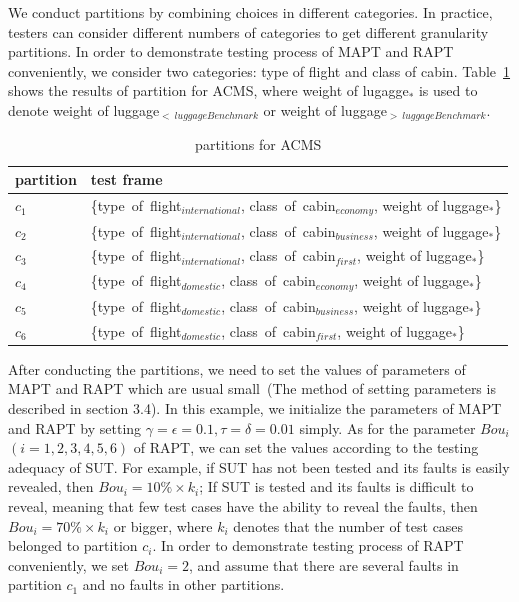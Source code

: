 \documentclass[10pt,journal,compsoc]{IEEEtran}
\begin{document}
We conduct partitions by combining choices in different categories. In practice, testers can consider different numbers of categories to get different granularity partitions. In order to demonstrate testing process of MAPT and RAPT conveniently, we consider two categories: type of flight and class of cabin. Table~\ref{table:partitionrule} shows the results of partition for ACMS, where weight of lugagge$_{*}$ is used to denote weight of luggage$_{<~luggageBenchmark}$ or weight of luggage$_{>~luggageBenchmark}$.
\begin{table}
  \caption{partitions for ACMS}
  \label{table:partitionrule}
  \centering
  \begin{tabular}{|l|l|} \hline
  partition       & test frame \\ \hline
  $c_1$  & \{type~of~flight$_{international}$, class~of~cabin$_{economy}$, weight of luggage$_{*}$\} \\ \hline
  $c_2$  & \{type~of~flight$_{international}$, class~of~cabin$_{business}$, weight of luggage$_{*}$\} \\ \hline
  $c_3$  & \{type~of~flight$_{international}$, class~of~cabin$_{first}$, weight of luggage$_{*}$\} \\ \hline
  $c_4$  & \{type~of~flight$_{domestic}$, class~of~cabin$_{economy}$, weight of luggage$_{*}$\} \\ \hline
  $c_5$  & \{type~of~flight$_{domestic}$, class~of~cabin$_{business}$, weight of luggage$_{*}$\} \\ \hline
  $c_6$  & \{type~of~flight$_{domestic}$, class~of~cabin$_{first}$, weight of luggage$_{*}$\} \\ \hline
  \end{tabular}
\end{table}

After conducting the partitions, we need to set the values of parameters of MAPT and RAPT which are usual small~(The method of setting parameters is described in section 3.4). In this example, we initialize the parameters of MAPT and RAPT by setting $\gamma = \epsilon = 0.1, \tau=\delta=0.01$ simply. As for the parameter $Bou_i$ $(i=1,2,3,4,5,6)$ of RAPT, we can set the values according to the testing adequacy of SUT. For example, if SUT has not been tested and its faults is easily revealed, then $Bou_i = 10\%\times k_i$; If SUT is tested and its faults is difficult to reveal, meaning that few test cases have the ability to reveal the faults, then $Bou_i = 70\%\times k_i$ or bigger, where $k_i$ denotes that the number of test cases belonged to partition $c_i$. In order to demonstrate testing process of RAPT conveniently, we set $Bou_i = 2$, and assume that there are several faults in partition $c_1$ and no faults in other partitions.
\end{document}
